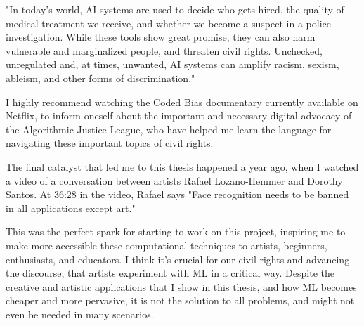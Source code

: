 \begin{displayquote}
"In today’s world, AI systems are used to decide who gets hired, the quality of medical treatment we receive, and whether we become a suspect in a police investigation. While these tools show great promise, they can also harm vulnerable and marginalized people, and threaten civil rights. Unchecked, unregulated and, at times, unwanted, AI systems can amplify racism, sexism, ableism, and other forms of discrimination."
\end{displayquote}

I highly recommend watching the Coded Bias documentary \cite{website-coded-bias} currently available on Netflix, to inform oneself about the important and necessary digital advocacy of the Algorithmic Justice League, who have helped me learn the language for navigating these important topics of civil rights.

The final catalyst that led me to this thesis happened a year ago, when I watched a video \cite{website-talk-technology-and-public-art-rafael-lozano-hemmer} of a conversation between artists Rafael Lozano-Hemmer and Dorothy Santos. At 36:28 in the video, Rafael says "Face recognition needs to be banned in all applications except art."

This was the perfect spark for starting to work on this project, inspiring me to make more accessible these computational techniques to artists, beginners, enthusiasts, and educators. I think it's crucial for our civil rights and advancing the discourse, that artists experiment with \acrshort{ML} in a critical way. Despite the creative and artistic applications that I show in this thesis, and how \acrshort{ML} becomes cheaper and more pervasive, it is not the solution to all problems, and might not even be needed in many scenarios.

